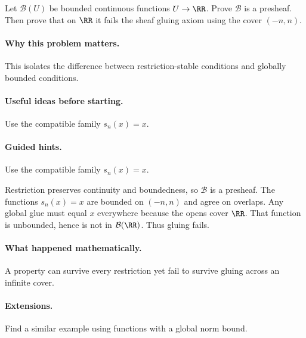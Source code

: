 \begin{problem}
Let $\mathcal B(U)$ be bounded continuous functions $U\to\RR$.  Prove $\mathcal B$ is a presheaf.  Then prove that on $\RR$ it fails the sheaf gluing axiom using the cover $(-n,n)$.
\end{problem}

\paragraph{Why this problem matters.}
This isolates the difference between restriction-stable conditions and globally bounded conditions.

\paragraph{Useful ideas before starting.}
Use the compatible family $s_n(x)=x$.

\paragraph{Guided hints.}
Use the compatible family $s_n(x)=x$.

\begin{solution}
Restriction preserves continuity and boundedness, so $\mathcal B$ is a presheaf.  The functions $s_n(x)=x$ are bounded on $(-n,n)$ and agree on overlaps.  Any global glue must equal $x$ everywhere because the opens cover $\RR$.  That function is unbounded, hence is not in $\mathcal B(\RR)$.  Thus gluing fails.
\end{solution}

\paragraph{What happened mathematically.}
A property can survive every restriction yet fail to survive gluing across an infinite cover.

\paragraph{Extensions.}
Find a similar example using functions with a global norm bound.
